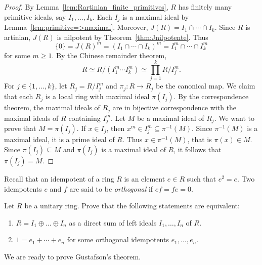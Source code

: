 \begin{proof}
    By Lemma~\ref{lem:Rartinian_finite_primitives}, $R$ has finitely many primitive ideals, say 
    $I_1,\dots,I_k$. 
    Each $I_j$ is a maximal ideal by 
    Lemma~\ref{lem:primitive=>maximal}. 
    Moreover, $J(R)=I_1\cap\cdots\cap I_k$. 
    Since $R$ is artinian, $J(R)$ is nilpotent by Theorem~\ref{thm:Jnilpotente}. Thus
    \[
    \{0\}=J(R)^m=(I_1\cap\cdots\cap I_k)^m=I_1^m\cap\cdots\cap I_k^m
    \]
    for some $m\geq1$. By the Chinese remainder theorem, 
    \[
    R\simeq R/(I_1^m\cdots I_k^m)\simeq \prod_{j=1}^k R/I_j^m.
    \]
    For $j\in\{1,\dots,k\}$, let $R_j=R/I_j^m$ and 
    $\pi_j\colon R\to R_j$ be the canonical map. 
    We claim that each $R_j$ is a local ring 
    with maximal ideal $\pi(I_j)$. 
    By the correspondence theorem, the maximal ideals of $R_j$ are in bijective 
    correspondence with
    the maximal ideals of $R$ containing $I_j^m$. 
    Let $M$ be a maximal ideal of $R_j$. We want to prove that $M=\pi(I_j)$. 
    If $x\in I_j$, then $x^m\in I_j^m\subseteq\pi^{-1}(M)$. Since $\pi^{-1}(M)$ is a maximal ideal, 
    it is a prime ideal of $R$. Thus $x\in\pi^{-1}(M)$, that is $\pi(x)\in M$. 
    Since $\pi(I_j)\subseteq M$ and $\pi(I_j)$ is a maximal ideal of $R$, it follows
    that $\pi(I_j)=M$. 
\end{proof}


Recall that an idempotent of a ring $R$ is an element $e\in R$ such that $e^2=e$. Two idempotents 
$e$ and $f$ are said to be \emph{orthogonal} if $ef=fe=0$. 

\begin{exercise}
    \label{xca:idempotents_decomposition}
    Let $R$ be a unitary ring. Prove that the following statements are equivalent: 
    \begin{enumerate}
        \item $R = I_1 \oplus \ldots \oplus I_n$ as a direct sum of left ideals $I_1,\dots,I_n$ of $R$. 
        \item $1=e_1+\cdots+e_n$ for some orthogonal idempotents $e_1,\dots,e_n$.
    \end{enumerate}
\end{exercise}


We are ready to prove Gustafson's theorem. 

